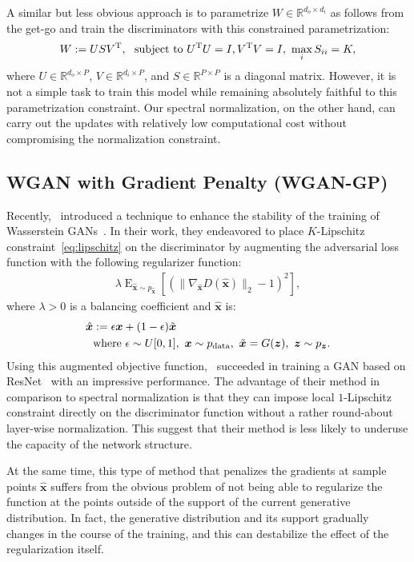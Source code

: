 \documentclass{article}
\newcommand{\bbR}{\mathbb{R}}
\newcommand{\bmx}{{\bm x}}
\newcommand{\bmz}{{\bm z}}
\newcommand{\E}{\mathop{\mathrm{E}}}
\begin{document}
A similar but less obvious approach is to parametrize $W \in \bbR^{d_o \times d_i}$ as follows from the get-go and train the discriminators with this constrained parametrization:
\begin{align}
	W := USV^{\rm T}, ~{\rm\ subject\ to\ } U^{\rm T} U = I,  V^{\rm T} V = I,~\max_{i} {S_{ii}} = K,
\end{align}
where $U\in \bbR^{d_{o} \times P}$, $V\in \bbR^{d_{i}\times P}$, and $S \in \bbR^{P \times P}$ is a diagonal matrix.
However, it is not a simple task to train this model while remaining absolutely faithful to this parametrization constraint.
Our spectral normalization, on the other hand, can carry out the updates with relatively low computational cost without compromising the normalization constraint.

\subsection{WGAN with Gradient Penalty (WGAN-GP)} \label{subsubsec:wgan-gp}
Recently,~\cite{gulrajani2017improved} introduced a technique to enhance the stability of the training of Wasserstein GANs~\cite[]{arjovsky2017wasserstein}.
In their work, they endeavored to place $K$-Lipschitz constraint~\eqref{eq:lipschitz} on the discriminator by augmenting the adversarial loss function with the following regularizer function:
\begin{align}
	\lambda \E_{\hat{\bmx} \sim p_{\hat{\bmx}}}[(\|\nabla_{\hat{\bmx}}D(\hat{\bmx})\|_2-1)^2], \label{eq:wgan_gp_reg}
\end{align}
where $\lambda > 0$ is a balancing coefficient and $\hat{\bmx}$ is:
\begin{align}
	\hat{\bmx} &:= \epsilon \bmx + (1-\epsilon) \tilde{\bmx} \\
    &{\rm where~}\epsilon \sim U[0,1],~\bmx \sim p_{\rm data}, ~\tilde{\bmx}=G(\bmz),~\bmz \sim p_\bmz.
\end{align}
Using this augmented objective function,~\cite{gulrajani2017improved} succeeded in training a GAN based on ResNet~\cite[]{he2016deep} with an impressive performance.
The advantage of their method in comparison to spectral normalization is that they can impose local $1$-Lipschitz constraint directly on the discriminator function without a rather round-about layer-wise normalization.
This suggest that their method is less likely to underuse the capacity of the network structure.

At the same time, this type of method that penalizes the gradients at sample points $\hat{\bmx}$ suffers from the obvious problem of not being able to regularize the function at the points outside of the support of the current generative distribution.
In fact, the generative distribution and its support gradually changes in the course of the training, and this can destabilize the effect of the regularization itself.
\end{document}
